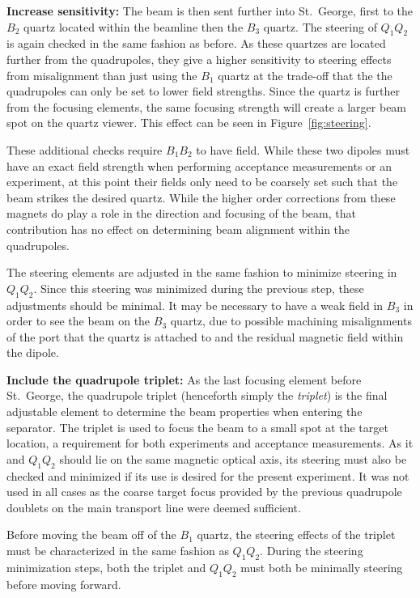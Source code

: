 \textbf{Increase sensitivity:}
The beam is then sent further into St.\ George, first to the $B_2$
quartz located within the beamline then the $B_3$ quartz. The steering
of $Q_1Q_2$ is again checked in the same fashion as before. As these
quartzes are located further from the quadrupoles, they give a higher
sensitivity to steering effects from misalignment than just using the
$B_1$ quartz at the trade-off that the the quadrupoles can only be set
to lower field strengths. Since the quartz is further from the focusing
elements, the same focusing strength will create a larger beam spot on
the quartz viewer. This effect can be seen in Figure~\ref{fig:steering}.

These additional checks require $B_1B_2$ to have field. While these two
dipoles must have an exact field strength when performing acceptance
measurements or an experiment, at this point their fields only need to
be coarsely set such that the beam strikes the desired quartz. While the
higher order corrections from these magnets do play a role in the
direction and focusing of the beam, that contribution has no effect on
determining beam alignment within the quadrupoles.

The steering elements are adjusted in the same fashion to minimize
steering in $Q_1Q_2$. Since this steering was minimized during the
previous step, these adjustments should be minimal. It may be necessary
to have a weak field in $B_3$ in order to see the beam on the $B_3$
quartz, due to possible machining misalignments of the port that the
quartz is attached to and the residual magnetic field within the dipole.

\textbf{Include the quadrupole triplet:}
As the last focusing element before St.\ George, the quadrupole triplet
(henceforth simply the \emph{triplet}) is the final adjustable element
to determine the beam properties when entering the separator. The
triplet is used to focus the beam to a small spot at the target
location, a requirement for both experiments and acceptance
measurements. As it and $Q_1Q_2$ should lie on the same magnetic optical
axis, its steering must also be checked and minimized if its use is
desired for the present experiment. It was not used in all cases as the
coarse target focus provided by the previous quadrupole doublets on the
main transport line were deemed sufficient.

Before moving the beam off of the $B_1$ quartz, the steering effects of
the triplet must be characterized in the same fashion as $Q_1Q_2$.
During the steering minimization steps, both the triplet and $Q_1Q_2$
must both be minimally steering before moving forward.

